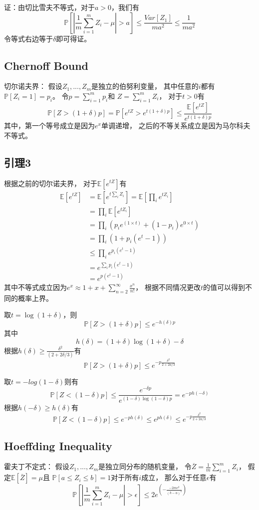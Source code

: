 \documentclass[UTF8]{ctexart}
\begin{document}
证：由切比雪夫不等式，对于$a>0$，我们有
$$
\mathbb{P}[|\frac{1}{m}\sum^m_{i=1}Z_i-\mu|>a]\leq 
\frac{Var[Z_1]}{ma^2}\leq \frac{1}{ma^2}
$$
令等式右边等于$\delta$即可得证。


\subsection{Chernoff Bound}
切尔诺夫界：
假设$Z_1,...,Z_m$是独立的伯努利变量，
其中任意的$i$都有
$\mathbb{P}[Z_i=1]=p_i$。
令$p=\sum^m_{i=1}p_i$和
$Z=\sum^m_{i=1}Z_i$，
对于$t>0$有
$$
\mathbb{P}[Z>(1+\delta)p]=
\mathbb{P}[e^{tZ}>e^{t(1+\delta)p}]\leq
\frac{\mathbb{E}[e^{tZ}]}{e^{t(1+\delta)p}}
$$
其中，第一个等号成立是因为$e^x$单调递增，
之后的不等关系成立是因为马尔科夫不等式。

\subsection{引理3}
根据之前的切尔诺夫界，
对于$\mathbb{E}[e^{tZ}]$有
$$
\begin{aligned}
\mathbb{E}[e^{tZ}] &= \mathbb{E}[e^{t\sum_iZ_i}]= \mathbb{E}[\prod_ie^{tZ_i}]\\
	&= \prod_i\mathbb{E}[e^{tZ_i}]\\
	&= \prod_i(p_ie^{(1\times t)}+(1-p_i)e^{0\times t})\\
	&= \prod_i(1+p_i(e^t-1))\\
	&\leq \prod_ie^{p_i(e^t-1)}\\
	&= e^{\sum_ip_i(e^t-1)}\\
	&= e^{p(e^t-1)}
\end{aligned}
$$
其中不等式成立因为$e^x\approx 1+x+\sum^\infty_{n=2}\frac{x^n}{n!}$，
根据不同情况更改$t$的值可以得到不同的概率上界。

取$t=\log(1+\delta)$，则
$$
\mathbb{P}[Z>(1+\delta)p]\leq e^{-h(\delta)p}
$$
其中
$$
h(\delta)=(1+\delta)\log(1+\delta)-\delta
$$
根据$h(\delta)\geq \frac{\delta^2}{(2+2\delta/3)}$有
$$
\mathbb{P}[Z>(1+\delta)p]\leq e^{-p\frac{\delta^2}{2+2a/3}}
$$

取$t=-log(1-\delta)$则有
$$
\mathbb{P}[Z<(1-\delta)p]\leq
\frac{e^{-\delta p}}{e^{(1-\delta)\log(1-\delta)p}}=
e^{-ph(-\delta)}
$$
根据$h(-\delta)\geq h(\delta)$有
$$
\mathbb{P}[Z<(1-\delta)p]\leq
e^{-ph(\delta)}\leq e^{ph(\delta)}\leq
e^{-p\frac{\delta^2}{2+2a/3}}
$$


\subsection{Hoeffding Inequality}
霍夫丁不定式：
假设$Z_1,...,Z_m$是独立同分布的随机变量，
令$\overline{Z}=\frac{1}{m}\sum^m_{i=1}Z_i$，
假定$\mathbb{E}[\bar{Z}]=\mu$且
$\mathbb{P}[a\leq Z_i \leq b]=1$对于所有$i$成立，
那么对于任意$\epsilon$有
$$
\mathbb{P}[|\frac{1}{m}\sum^m_{i=1}Z_i-\mu|>\epsilon]\leq
2e^{(-\frac{-2m\epsilon^2}{(b-a)^2})}
$$
\end{document}

